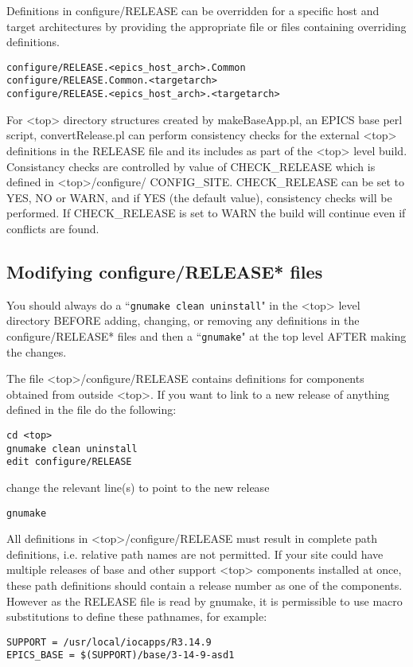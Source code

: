 Definitions in configure/RELEASE can be overridden for a specific host and target architectures by providing the 
appropriate file or files containing overriding definitions.
\begin{verbatim}
configure/RELEASE.<epics_host_arch>.Common
configure/RELEASE.Common.<targetarch>
configure/RELEASE.<epics_host_arch>.<targetarch>
\end{verbatim}
For \textless{}top\textgreater{} directory structures created by makeBaseApp.pl, an EPICS base perl script, convertRelease.pl can perform 
consistency checks for the external \textless{}top\textgreater{} definitions in the RELEASE file and its includes as part of the \textless{}top\textgreater{} level 
build. Consistancy checks are controlled by value of CHECK\_RELEASE which is defined in \textless{}top\textgreater{}/configure/
CONFIG\_SITE. CHECK\_RELEASE can be set to YES, NO or WARN, and if YES (the default value), consistency 
checks will be performed. If CHECK\_RELEASE is set to WARN the build will continue even if conflicts are found.

\subsection{Modifying configure/RELEASE* files}

You should always do a ``\verb|gnumake clean uninstall|" in the \textless{}top\textgreater{} level directory BEFORE adding, changing, or 
removing any definitions in the configure/RELEASE* files and then a ``\verb|gnumake|" at the top level AFTER making the 
changes.

The file \textless{}top\textgreater{}/configure/RELEASE contains definitions for components obtained from outside \textless{}top\textgreater{}. If you want to link 
to a new release of anything defined in the file do the following:
\begin{verbatim}
cd <top>
gnumake clean uninstall
edit configure/RELEASE
\end{verbatim}
change the relevant line(s) to point to the new release
\begin{verbatim}
gnumake
\end{verbatim}
All definitions in \textless{}top\textgreater{}/configure/RELEASE must result in complete path definitions, i.e. relative path names are not 
permitted. If your site could have multiple releases of base and other support \textless{}top\textgreater{} components installed at once, these 
path definitions should contain a release number as one of the components. However as the RELEASE file is read by 
gnumake, it is permissible to use macro substitutions to define these pathnames, for example:
\begin{verbatim}
SUPPORT = /usr/local/iocapps/R3.14.9 
EPICS_BASE = $(SUPPORT)/base/3-14-9-asd1
\end{verbatim}

